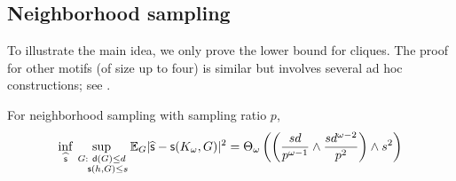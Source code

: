 \subsection{Neighborhood sampling} \label{app:lb-neighborhood}


To illustrate the main idea, we only prove the lower bound for cliques. The proof for other motifs (of size up to four) is similar but involves several ad hoc constructions; see .

\begin{theorem}[Cliques] \label{thm:neighborhood_main}
For neighborhood sampling with sampling ratio $p$,
\[
\inf_{\widehat{\mathsf{s}}} \sup_{\substack{G: ~{\mathsf{d}}(G)\leq d\\ ~~~\mathsf{s}(h,G) \leq s}} 
\mathbb{E}_G|\widehat{\mathsf{s}}-\mathsf{s}(K_{\omega}, G)|^2 = \Theta_{\omega} \left( \left(\frac{s d}{p^{\omega-1}} \wedge  \frac{s d^{\omega-2}}{p^2}\right) \wedge s^2 \right)
\]
\end{theorem}

